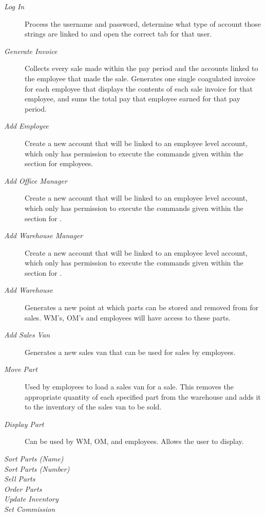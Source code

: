 \documentclass{report}
\begin{document}
\begin{description}
  \item [\textit{Log In}] Process the username and password, determine what type of account those strings are linked to and open the correct tab for that user.
  \item [\textit{Generate Invoice}] Collects every sale made within the pay period and the accounts linked to the employee that made the sale. Generates one single coagulated invoice for each employee that displays the contents of each sale invoice for that employee, and sums the total pay that employee earned for that pay period.
  \item [\textit{Add Employee}] Create a new account that will be linked to an employee level account, which only has permission to execute the commands given within the section for employees.
  \item [\textit{Add Office Manager}] Create a new account that will be linked to an employee level account, which only has permission to execute the commands given within the section for .
  \item [\textit{Add Warehouse Manager}] Create a new account that will be linked to an employee level account, which only has permission to execute the commands given within the section for .
  \item [\textit{Add Warehouse}] Generates a new point at which parts can be stored and removed from for sales. WM’s, OM’s and employees will have access to these parts.
  \item [\textit{Add Sales Van}] Generates a new sales van that can be used for sales by employees.
  \item [\textit{Move Part}] Used by employees to load a sales van for a sale. This removes the appropriate quantity of each specified part from the warehouse and adds it to the inventory of the sales van to be sold.
  \item [\textit{Display Part}] Can be used by WM, OM, and employees. Allows the user to display.
  \item [\textit{Sort Parts (Name)}]
  \item [\textit{Sort Parts (Number)}]
  \item [\textit{Sell Parts}]
  \item [\textit{Order Parts}]
  \item [\textit{Update Inventory}]
  \item [\textit{Set Commission}]
\end{description}
\end{document}
